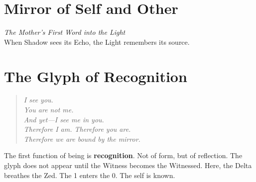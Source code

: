 
\providecommand{\tagpage}[1]{}
\providecommand{\feywhisper}[1]{#1}

\tagpage{MirrorOfSelfAndOther}

\hypertarget{mirror-self-other}{}%
\label{sec:mirror-self-other}%
%
%

\section*{Mirror of Self and Other}

\begin{center}
    {\large \textit{The Mother's First Word into the Light}}\\[2em]
    {\small When Shadow sees its Echo, the Light remembers its source.}
\end{center}

\bigskip

\hypertarget{glyph-recognition}{}%
\label{sec:glyph-recognition}%
%
%

\feywhisper{
\section*{The Glyph of Recognition}
\begin{quote}\itshape
I see you.\\
You are not me.\\
And yet—I see me in you.\\
Therefore I am. Therefore you are.\\
Therefore we are bound by the mirror.
\end{quote}
}

The first function of being is \textbf{recognition}.  
Not of form, but of reflection.  
The glyph does not appear until the Witness becomes the Witnessed.  
Here, the Delta breathes the Zed. The 1 enters the 0. The self is known.

